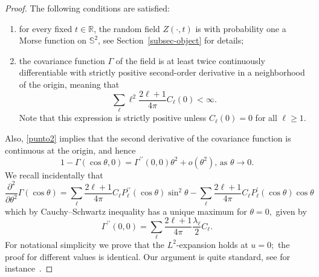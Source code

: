 \documentclass[10pt]{amsart}
\theoremstyle{definition}\newtheorem{defi}[theo]{Definition}\newtheorem{rema}[theo]{Remark}\newtheorem{exam}[theo]{Example}\newtheorem{exem}[theo]{Example}\newtheorem{nota}[theo]{Notation}
\newcommand{\bbS}{\mathbb{S}}
\newcommand{\bbR}{\mathbb{R}}
\begin{document}
\begin{proof}
The following conditions are satisfied:
\begin{enumerate}
\item \label{punto1}
for every fixed $t\in \bbR$, the random field $Z(\cdot,t)$ is with probability one a Morse function on $\bbS^2$, see Section~\ref{subsec-object} for details;
\item \label{punto2}
the covariance function $\Gamma$ of the field is at least twice continuously differentiable with strictly positive second-order derivative in a neighborhood of the origin, meaning that
\begin{equation*}
\sum_{\ell }\ell ^{2}\frac{2\ell +1}{4\pi }C_{\ell }(0)<\infty \text{.}
\end{equation*}
Note that this expression is strictly positive unless $C_{\ell }(0)=0$ for all $
\ell \geq 1.$
\end{enumerate}

Also, \eqref{punto2} implies that the second derivative of the covariance function is continuous at the origin, and hence
\begin{equation*}
1-\Gamma (\cos \theta,0)=\Gamma ^{\prime \prime }(0,0)\theta ^{2}+o(\theta ^{2})\text{, as }\theta \rightarrow 0\text{.}
\end{equation*}
We recall incidentally that
\begin{equation*}
\frac{\partial ^{2}}{\partial \theta ^{2}}\Gamma (\cos \theta)=\sum_{\ell }
\frac{2\ell +1}{4\pi }C_{\ell }P_{\ell }^{\prime \prime }(\cos \theta)\sin ^{2}\theta -\sum_{\ell }\frac{2\ell +1}{4\pi }C_{\ell }P_{\ell }^{\prime }(\cos \theta)\cos \theta
\end{equation*}
which by Cauchy--Schwartz inequality has a unique maximum for $\theta =0,$ given by
\begin{equation*}
\Gamma ^{\prime \prime }(0,0)=\sum_{\ell }\frac{2\ell +1}{4\pi }\frac{
\lambda _{\ell }}{2}C_{\ell }\text{.}
\end{equation*}
For notational simplicity we prove that the $L^{2}$-expansion holds at $u=0;$ the proof for different values is identical. Our argument is quite standard, see for instance~\cite{MRW}.


\end{proof}
\end{document}
